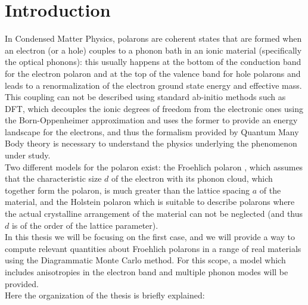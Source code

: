 \section*{Introduction}
In Condensed Matter Physics, polarons are coherent states that are formed when an electron (or a hole) couples to a phonon bath in an ionic material (specifically the optical phonons): 
this usually happens at the bottom of the conduction band for the electron polaron and at the top of the valence band for hole polarons and leads to a renormalization of the electron 
ground state energy and effective mass.\\
This coupling can not be described using standard ab-initio methods such as DFT, which decouples the ionic degrees of freedom from the electronic ones using 
the Born-Oppenheimer approximation and uses the former to provide an energy landscape for the electrons, and thus the formalism provided by Quantum Many Body theory 
is necessary to understand the physics underlying the phenomenon under study.\\
Two different models for the polaron exist: the Froehlich polaron \cite{frohlich1954electrons}, which assumes that the characteristic size $d$ of the electron with its phonon cloud, 
which together form the polaron, is much greater than the lattice spacing $a$ of the material, and the Holstein polaron \cite{holstein1959studies} which is suitable to describe 
polarons where the actual crystalline arrangement of the material can not be neglected (and thus $d$ is of the order of the lattice parameter).\\
In this thesis we will be focusing on the first case, and we will provide a way to compute relevant quantities about Froehlich polarons in a range 
of real materials using the Diagrammatic Monte Carlo method. For this scope, a model which includes anisotropies in the electron band and multiple phonon modes 
will be provided.\\
Here the organization of the thesis is briefly explained:
